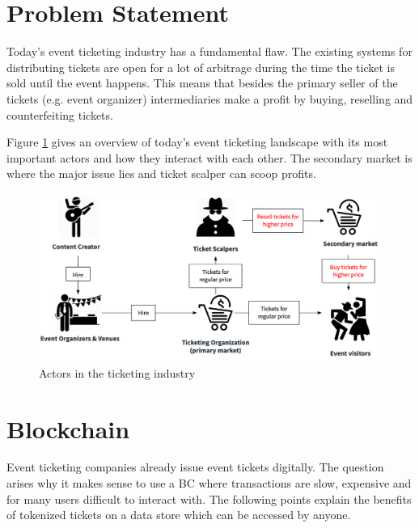 \section{Problem Statement}
Today's event ticketing industry has a fundamental flaw. The existing systems for distributing tickets are open for a lot of arbitrage during the time the ticket is sold until the event happens. This means that besides the primary seller of the tickets (e.g. event organizer) intermediaries make a profit by buying, reselling and counterfeiting tickets. 

Figure \ref{fig:ticketing-industry-landscape} gives an overview of today's event ticketing landscape with its most important actors and how they interact with each other. The secondary market is where the major issue lies and ticket scalper can scoop profits.

\begin{figure}[H]
    \centering
    \includegraphics[width=16cm]{figures/ticketing-industry-landscape.png}
    \caption{Actors in the ticketing industry}
    \label{fig:ticketing-industry-landscape}
\end{figure}

\section{Blockchain}
Event ticketing companies already issue event tickets digitally. The question arises why it makes sense to use a BC where transactions are slow, expensive and for many users difficult to interact with. The following points explain the benefits of tokenized tickets on a data store which can be accessed by anyone. 


